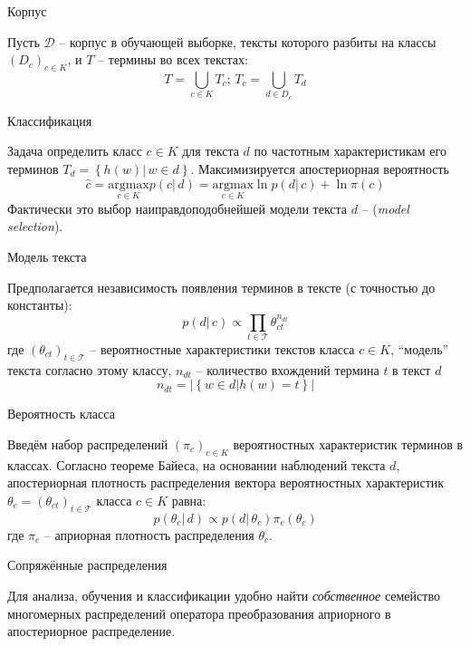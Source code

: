 \documentclass{beamer}
\newcommand{\eng}[1]{\foreignlanguage{english}{#1}}
\newcommand{\obj}[1]{\left\{ #1 \right \}}
\newcommand{\brac}[1]{\left ( #1 \right )}
\newcommand{\induc}[1]{\left . #1 \right \vert}
\newcommand{\abs}[1]{\left | #1 \right |}
\newcommand{\Dcal}{\mathcal{D}}
\newcommand{\Tcal}{\mathcal{T}}
\begin{document}
\begin{frame}
  \begin{block}{Корпус}

    Пусть $\Dcal$ -- корпус в обучающей выборке, тексты которого разбиты на классы $\brac{D_c}_{c\in K}$, и $T$ -- термины во всех текстах:
    \[T = \bigcup_{c\in K}T_c;\,T_c = \bigcup_{d\in D_c} T_d\]
  \end{block}

  \begin{block}{Классификация}

    Задача определить класс $c\in K$ для текста $d$ по частотным характеристикам его терминов $T_d = \obj{\induc{h(w)}\,w\in d}$.
    Максимизируется апостериорная вероятность 
   \[\hat{c} = \underset{c\in K}{\text{argmax}} p\brac{\induc{c}\,d} = \underset{c\in K}{\text{argmax}} \ln p\brac{\induc{d}\,c} + \ln \pi\brac{c} \]
    Фактически это выбор наиправдоподобнейшей модели текста $d$ -- (\eng{\emph{model selection}}).
  \end{block}
\end{frame}

\begin{frame}
  \begin{block}{Модель текста}

    Предполагается независимость появления терминов в тексте (с точностью до константы):
    \[p\brac{\induc{d}\,c} \propto \prod_{t\in \Tcal}\theta_{ct}^{n_{dt}}\]
    где $\brac{\theta_{ct}}_{t\in \Tcal}$ -- вероятностные характеристики текстов класса $c\in K$, ``модель'' текста согласно этому классу, $n_{dt}$ -- количество вхождений термина $t$ в текст $d$
    \[n_{dt} = \abs{\obj{\induc{w\in d} h(w) = t}}\]
  \end{block}

\end{frame}

\begin{frame}
  \begin{block}{Вероятность класса}

    Введём набор распределений $\brac{\pi_c}_{c\in K}$ вероятностных характеристик терминов в классах.
    Согласно теореме Байеса, на основании наблюдений текста $d$, апостериорная плотность распределения вектора вероятностных характеристик $\theta_c = \brac{\theta_{ct}}_{t\in \Tcal}$ класса $c\in K$ равна:
      \[p\brac{\induc{\theta_c}\,d} \propto p\brac{\induc{d}\,\theta_c}\pi_c(\theta_c)\]
    где $\pi_c$ -- априорная плотность распределения $\theta_c$.
  \end{block}
  \begin{block}{Сопряжённые распределения}

    Для анализа, обучения и классификации удобно найти \emph{собственное} семейство многомерных распределений оператора преобразования априорного в апостериорное распределение.
  \end{block}
\end{frame}
\end{document}

